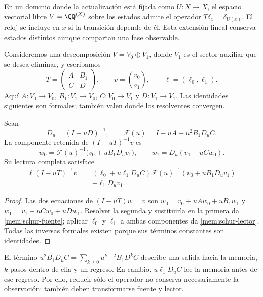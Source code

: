 En un dominio donde la actualización está fijada como \(U:X\to X\),
el espacio vectorial libre \(V=\QQ^{(X)}\) sobre los estados admite el operador
\(T\delta_x=\delta_{U(x)}\). El reloj se incluye en \(x\) si la
transición depende de él. Esta extensión lineal conserva estados
distintos aunque compartan una fase observable.

Consideremos una descomposición \(V=V_0\oplus V_1\), donde \(V_1\)
es el sector auxiliar que se desea eliminar, y escribamos
\[
 T=\begin{pmatrix}A&B_1\\C&D\end{pmatrix},\qquad
 v=\binom{v_0}{v_1},\qquad \ell=(\ell_0,\ell_1).
\]
Aquí \(A:V_0\to V_0\), \(B_1:V_1\to V_0\),
\(C:V_0\to V_1\) y \(D:V_1\to V_1\).
Las identidades siguientes son formales; también valen donde los
resolventes convergen.

\begin{proposition}
\label{mem:prop-schur}
Sean
\[
 D_u=(I-uD)^{-1},\qquad
 \mathscr F(u)=I-uA-u^2B_1D_uC.
\]
La componente retenida de \((I-uT)^{-1}v\) es
\begin{equation}
 w_0=\mathscr F(u)^{-1}\bigl(v_0+uB_1D_uv_1\bigr),
 \qquad w_1=D_u(v_1+uCw_0).
 \label{mem:schur-fuente}
\end{equation}
Su lectura completa satisface
\begin{equation}
 \begin{split}
 \ell(I-uT)^{-1}v
 ={}&(\ell_0+u\ell_1D_uC)
       \mathscr F(u)^{-1}(v_0+uB_1D_uv_1)\\
    &+\ell_1D_uv_1.
 \end{split}
 \label{mem:schur-lector}
\end{equation}
\end{proposition}
\begin{proof}
Las dos ecuaciones de \((I-uT)w=v\) son
\(w_0=v_0+uAw_0+uB_1w_1\) y
\(w_1=v_1+uCw_0+uDw_1\).
Resolver la segunda y sustituirla en la primera da
\eqref{mem:schur-fuente}; aplicar \(\ell_0\) y \(\ell_1\)
a ambas componentes da \eqref{mem:schur-lector}.
Todas las inversas formales existen porque sus términos constantes
son identidades.
\end{proof}

El término \(u^2B_1D_uC=\sum_{k\geq0}u^{k+2}B_1D^kC\)
describe una salida hacia la memoria, \(k\) pasos dentro de ella y
un regreso. En cambio, \(u\ell_1D_uC\) lee la memoria antes de ese
regreso. Por ello, reducir sólo el operador no conserva necesariamente
la observación: también deben transformarse fuente y lector.

